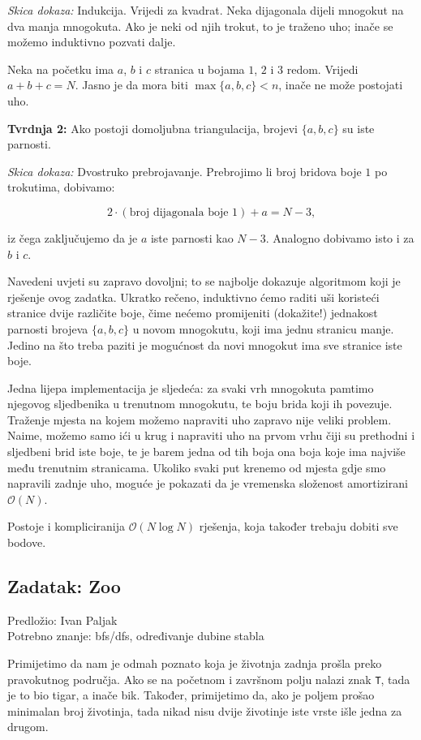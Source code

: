 \documentclass[a4paper]{article}
\begin{document}
\emph{Skica dokaza: } \; Indukcija. Vrijedi za kvadrat.
Neka dijagonala dijeli mnogokut na dva manja mnogokuta. Ako je neki od njih trokut, to je traženo uho;
inače se možemo induktivno pozvati dalje.

Neka na početku ima $a$, $b$ i $c$ stranica u bojama $1$, $2$ i $3$ redom.
Vrijedi $a+b+c = N$. Jasno je da mora biti $\max\{a, b, c\} < n$, inače ne može postojati uho.

\textbf{Tvrdnja 2: } \; Ako postoji domoljubna triangulacija, brojevi $\{a, b, c\}$ su iste parnosti.

\emph{Skica dokaza: } \; Dvostruko prebrojavanje.
Prebrojimo li broj bridova boje $1$ po trokutima, dobivamo:

$$
  2 \cdot (\text{broj dijagonala boje 1}) + a = N - 3,
$$

iz čega zaključujemo da je $a$ iste parnosti kao $N-3$. Analogno dobivamo isto i za $b$ i $c$.

Navedeni uvjeti su zapravo dovoljni; to se najbolje dokazuje algoritmom koji je rješenje ovog zadatka.
Ukratko rečeno, induktivno ćemo raditi uši koristeći stranice dvije različite boje,
čime nećemo promijeniti (dokažite!) jednakost parnosti brojeva $\{a, b, c\}$ u novom mnogokutu, koji
ima jednu stranicu manje.
Jedino na što treba paziti je mogućnost da novi mnogokut ima sve stranice iste boje.

Jedna lijepa implementacija je sljedeća: za svaki vrh mnogokuta pamtimo njegovog sljedbenika u
trenutnom mnogokutu, te boju brida koji ih povezuje. Traženje mjesta na kojem možemo napraviti
uho zapravo nije veliki problem.
Naime, možemo samo ići u krug i napraviti uho na prvom vrhu čiji su prethodni i sljedbeni brid
iste boje, te je barem jedna od tih boja ona boja koje ima najviše među trenutnim stranicama.
Ukoliko svaki put krenemo od mjesta gdje smo napravili zadnje uho, moguće je pokazati da
je vremenska složenost amortizirani $\mathcal{O}(N)$.

Postoje i kompliciranija $\mathcal{O}(N \log N)$ rješenja, koja također trebaju dobiti sve bodove.

\clearpage

\subsection*{Zadatak: Zoo}
\textsf{Predložio: Ivan Paljak}\\
\textsf{Potrebno znanje: bfs/dfs, određivanje dubine stabla}

Primijetimo da nam je odmah poznato koja je životnja zadnja prošla preko
pravokutnog područja. Ako se na početnom i završnom polju nalazi znak \texttt{T},
tada je to bio tigar, a inače bik. Također, primijetimo da, ako je poljem prošao
minimalan broj životinja, tada nikad nisu dvije životinje iste vrste išle jedna
za drugom.
\end{document}

